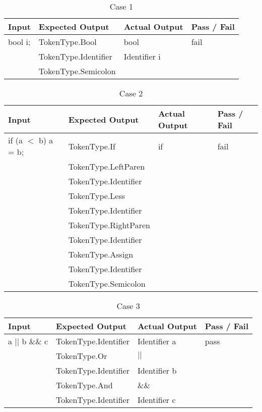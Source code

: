 \documentclass{article}
\begin{document}
\begin{table}[hp]
\begin{center}
\begin{tabular}{|l|l|l|l|}
\hline
Input & Expected Output & Actual Output & Pass / Fail \\
\hline
bool i; & TokenType.Bool & bool & fail \\
 & TokenType.Identifier & Identifier i & \\
 & TokenType.Semicolon & & \\
\hline
\end{tabular}
\end{center}
\caption{Case 1}
\end{table}

\begin{table}[hp]
\begin{center}
\begin{tabular}{|l|l|l|l|}
\hline
Input & Expected Output & Actual Output & Pass / Fail \\
\hline
if (a $<$ b) a = b; & TokenType.If & if & fail \\
 & TokenType.LeftParen & & \\
 & TokenType.Identifier & & \\
 & TokenType.Less & & \\
 & TokenType.Identifier & & \\
 & TokenType.RightParen & & \\
 & TokenType.Identifier & & \\
 & TokenType.Assign & & \\
 & TokenType.Identifier & & \\
 & TokenType.Semicolon & & \\
\hline
\end{tabular}
\end{center}
\caption{Case 2}
\end{table}

\begin{table}[hp]
\begin{center}
\begin{tabular}{|l|l|l|l|}
\hline
Input & Expected Output & Actual Output & Pass / Fail \\
\hline
a $||$ b \&\& c & TokenType.Identifier & Identifier a & pass \\
 & TokenType.Or & $||$ & \\
 & TokenType.Identifier & Identifier b & \\
 & TokenType.And & \&\& & \\
 & TokenType.Identifier & Identifier c & \\
\hline
\end{tabular}
\end{center}
\caption{Case 3}
\end{table}
\end{document}

